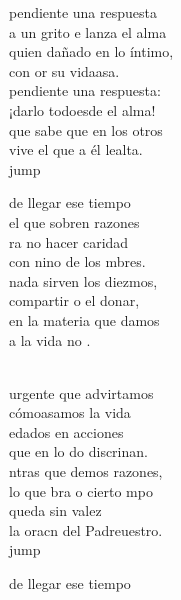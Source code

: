 \begin{cancion}%
	 pendiente una respuesta \\
	a un grito e lanza el alma\\
	quien dañado en lo íntimo, \\
	con or su vidaasa.\\
	 pendiente una respuesta: \\
	¡darlo todoesde el alma!\\
	que sabe que en los otros \\
	vive el  que a él lealta.\\jump\\
	\begin{chorus}%
	de llegar ese tiempo \\
	el que sobren razones\\
	ra no hacer caridad \\
	con nino de los mbres.\\
	nada sirven los diezmos,\\
	compartir o el donar,\\
	 en la materia que damos\\
	a la vida no .   \\
	\end{chorus}%
	\jump\\
	urgente que advirtamos \\
	cómoasamos la vida\\
	edados en acciones \\
	que en lo do discrinan.\\
	ntras que demos razones, \\
	lo que bra o cierto mpo\\
	queda sin valez \\
	la oracn del Padreuestro.\\jump\\
	\begin{chorus}%
	de llegar ese tiempo \\

\end{chorus}
\end{cancion}
